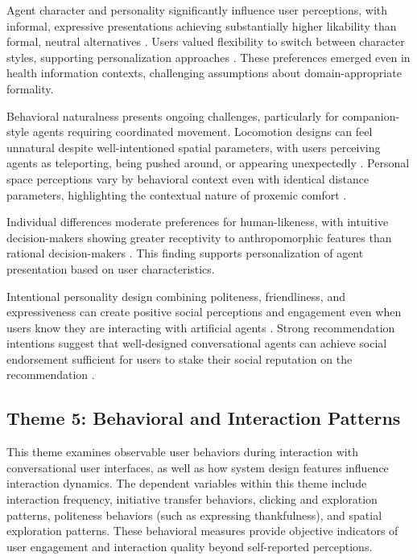 \documentclass[manuscript,anonymous,sigconf]{acmart}
\begin{document}
Agent character and personality significantly influence user perceptions, with informal, expressive presentations achieving substantially higher likability than formal, neutral alternatives \cite{A79}. Users valued flexibility to switch between character styles, supporting personalization approaches \cite{A79}. These preferences emerged even in health information contexts, challenging assumptions about domain-appropriate formality.

Behavioral naturalness presents ongoing challenges, particularly for companion-style agents requiring coordinated movement. Locomotion designs can feel unnatural despite well-intentioned spatial parameters, with users perceiving agents as teleporting, being pushed around, or appearing unexpectedly \cite{A82}. Personal space perceptions vary by behavioral context even with identical distance parameters, highlighting the contextual nature of proxemic comfort \cite{A82}.

Individual differences moderate preferences for human-likeness, with intuitive decision-makers showing greater receptivity to anthropomorphic features than rational decision-makers \cite{A42}. This finding supports personalization of agent presentation based on user characteristics.

Intentional personality design combining politeness, friendliness, and expressiveness can create positive social perceptions and engagement even when users know they are interacting with artificial agents \cite{A81}. Strong recommendation intentions suggest that well-designed conversational agents can achieve social endorsement sufficient for users to stake their social reputation on the recommendation \cite{A79}.

\subsection{Theme 5: Behavioral and Interaction Patterns}

This theme examines observable user behaviors during interaction with conversational user interfaces, as well as how system design features influence interaction dynamics. The dependent variables within this theme include interaction frequency, initiative transfer behaviors, clicking and exploration patterns, politeness behaviors (such as expressing thankfulness), and spatial exploration patterns. These behavioral measures provide objective indicators of user engagement and interaction quality beyond self-reported perceptions.
\end{document}
